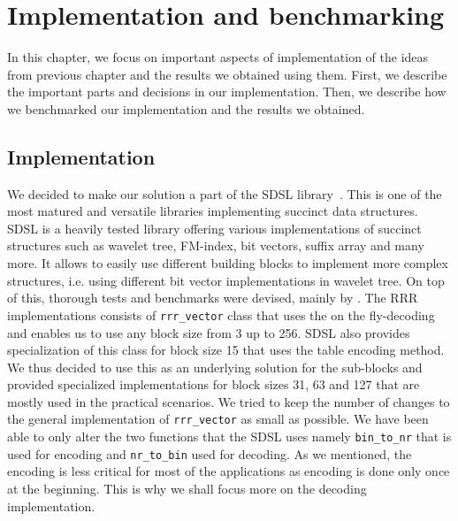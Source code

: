 \chapter{Implementation and benchmarking}
\label{kap:kap4}

In this chapter, we focus on important aspects of implementation of the ideas from
previous chapter and the results we obtained using them. First, we describe the
important parts and decisions in our implementation. Then, we describe how we
benchmarked our implementation and the results we obtained.

\section{Implementation}

We decided to make our solution a part of the SDSL library~\citep{gog2014theory}. This
is one of the most matured and versatile libraries implementing succinct data structures.
SDSL is a heavily tested library offering various implementations of succinct
structures such as wavelet tree, FM-index, bit vectors, suffix array and many more.
It allows to easily use different building blocks to implement more complex structures,
i.e. using different bit vector implementations in wavelet tree. On top of this, thorough
tests and benchmarks were devised, mainly by \cite{gog2014optimized}.
The RRR implementations consists of \texttt{rrr\_vector} class that uses the on the fly-decoding
and enables us to use any block size from 3 up to 256. SDSL also provides specialization
of this class for block size 15 that uses the table encoding method. We thus decided to use
this as an underlying solution for the sub-blocks and provided specialized implementations
for block sizes 31, 63 and 127 that are mostly used in the practical scenarios. We tried to
keep the number of changes to the general implementation of \texttt{rrr\_vector} as small as possible.
We have been able to only alter the two functions that the SDSL uses namely \texttt{bin\_to\_nr}
that is used for encoding and \texttt{nr\_to\_bin} used for decoding. As we mentioned, the encoding
is less critical for most of the applications as encoding is done only once at the beginning.
This is why we shall focus more on the decoding implementation.

